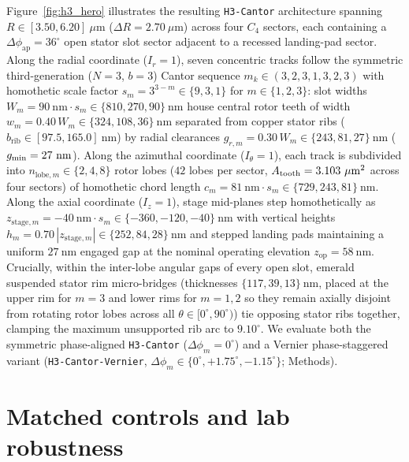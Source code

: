 \documentclass[pdflatex,sn-nature]{sn-jnl}
\begin{document}
Figure~\ref{fig:h3_hero} illustrates the resulting \texttt{H3-Cantor} architecture spanning $R \in [3.50, 6.20]\ \mu\mathrm{m}$ ($\Delta R = 2.70\ \mu\mathrm{m}$) across four $C_4$ sectors, each containing a $\Delta\phi_{\mathrm{ap}} = 36^\circ$ open stator slot sector adjacent to a recessed landing-pad sector. Along the radial coordinate ($I_r=1$), seven concentric tracks follow the symmetric third-generation ($N=3$, $b=3$) Cantor sequence $m_k \in (3,2,3,1,3,2,3)$ with homothetic scale factor $s_m = 3^{3-m} \in \{9,3,1\}$ for $m \in \{1,2,3\}$: slot widths $W_m = 90\ \mathrm{nm}\cdot s_m \in \{810, 270, 90\}\ \mathrm{nm}$ house central rotor teeth of width $w_m = 0.40\,W_m \in \{324, 108, 36\}\ \mathrm{nm}$ separated from copper stator ribs ($b_{\mathrm{rib}} \in [97.5, 165.0]\ \mathrm{nm}$) by radial clearances $g_{r,m} = 0.30\,W_m \in \{243, 81, 27\}\ \mathrm{nm}$ ($g_{\min} = \RobGminNmDisp{}\ \mathrm{nm}$). Along the azimuthal coordinate ($I_\theta=1$), each track is subdivided into $n_{\mathrm{lobe},m} \in \{2,4,8\}$ rotor lobes ($42$ lobes per sector, $A_{\mathrm{tooth}} = 3.103{}\ \mu\mathrm{m}^2$ across four sectors) of homothetic chord length $c_m = 81\ \mathrm{nm}\cdot s_m \in \{729, 243, 81\}\ \mathrm{nm}$. Along the axial coordinate ($I_z=1$), stage mid-planes step homothetically as $z_{\mathrm{stage},m} = -40\ \mathrm{nm}\cdot s_m \in \{-360, -120, -40\}\ \mathrm{nm}$ with vertical heights $h_m = 0.70\,|z_{\mathrm{stage},m}| \in \{252, 84, 28\}\ \mathrm{nm}$ and stepped landing pads maintaining a uniform $27\ \mathrm{nm}$ engaged gap at the nominal operating elevation $z_{\mathrm{op}} = 58\ \mathrm{nm}$. Crucially, within the inter-lobe angular gaps of every open slot, emerald suspended stator rim micro-bridges (thicknesses $\{117, 39, 13\}\ \mathrm{nm}$, placed at the upper rim for $m=3$ and lower rims for $m=1,2$ so they remain axially disjoint from rotating rotor lobes across all $\theta \in [0^\circ, 90^\circ)$) tie opposing stator ribs together, clamping the maximum unsupported rib arc to $9.10^\circ$. We evaluate both the symmetric phase-aligned \texttt{H3-Cantor} ($\Delta\phi_m = 0^\circ$) and a Vernier phase-staggered variant (\texttt{H3-Cantor-Vernier}, $\Delta\phi_m \in \{0^\circ, +1.75^\circ, -1.15^\circ\}$; Methods).

\section*{Matched controls and lab robustness}
\label{sec:robustness}
\end{document}
